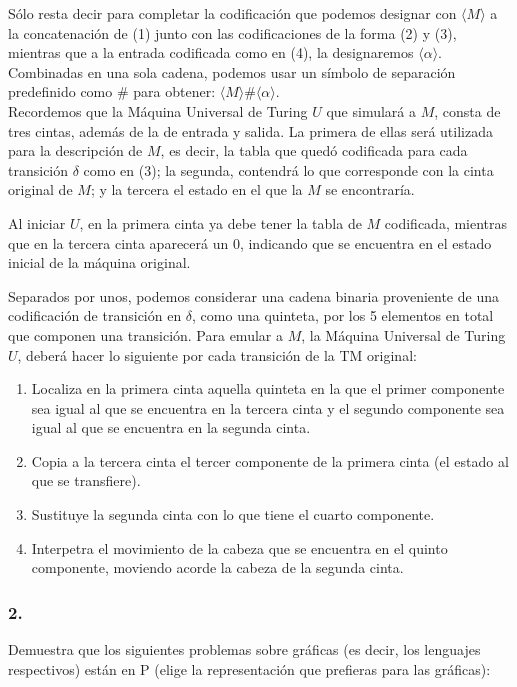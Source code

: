 \documentclass[12pt]{article}
\begin{document}
Sólo resta decir para completar la codificación que podemos designar con $\langle M\rangle$ a la concatenación de (1) junto con las codificaciones de la forma (2) y (3), mientras que a la entrada codificada como en (4), la designaremos $\langle \alpha\rangle$. Combinadas en una sola cadena,
podemos usar un símbolo de separación predefinido como $\#$ para obtener: $\langle M\rangle \# \langle \alpha\rangle$.\\
 
Recordemos que la Máquina Universal de Turing $U$ que simulará a $M$, consta de tres cintas, además de la de entrada y salida. La primera de ellas
será utilizada para la descripción de $M$, es decir, la tabla que quedó codificada para cada transición $\delta$ como en (3); la segunda, contendrá lo que corresponde con la cinta original de $M$; y la tercera el estado en el que la $M$ se encontraría.

Al iniciar $U$, en la primera cinta ya debe tener la tabla de $M$ codificada, mientras que en la tercera cinta aparecerá un 0, indicando que se encuentra en el estado inicial de la máquina original.

Separados por unos, podemos considerar una cadena binaria proveniente de una codificación de transición en $\delta$, como una quinteta, por los 5 elementos en total que componen una transición. Para emular a $M$, la Máquina Universal de Turing $U$, deberá hacer lo siguiente por cada
transición de la TM original:\\
\begin{enumerate}
\item Localiza en la primera cinta aquella quinteta en la que el primer componente sea igual al que se encuentra en la tercera cinta y el segundo
  componente sea igual al que se encuentra en la segunda cinta.
\item Copia a la tercera cinta el tercer componente de la primera cinta (el estado al que se transfiere).
\item Sustituye la segunda cinta con lo que tiene el cuarto componente.
\item Interpetra el movimiento de la cabeza que se encuentra en el quinto componente, moviendo acorde la cabeza de la segunda cinta. 
\end{enumerate}
\subsubsection*{2.}

 Demuestra que los siguientes problemas sobre gráficas (es decir, los lenguajes respectivos) están en P (elige la representación que prefieras para las gráficas):
 
\end{document}
